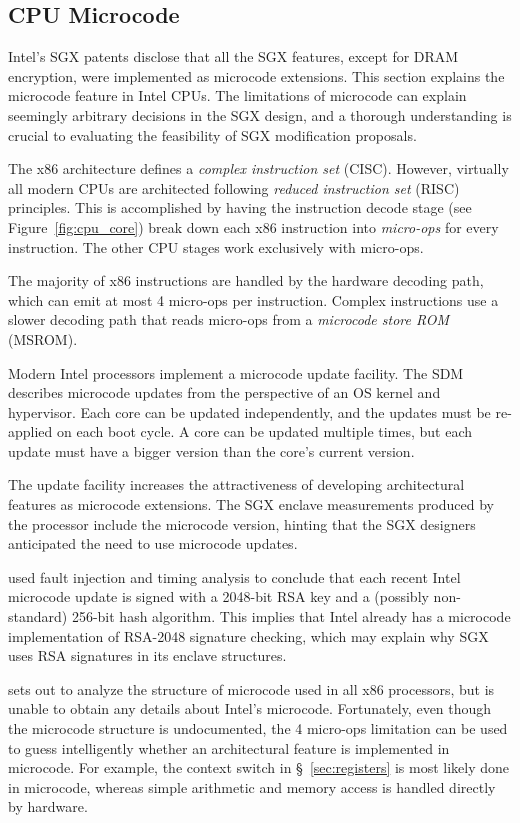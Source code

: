 \subsection{CPU Microcode}
\label{sec:microcode}

Intel's SGX patents disclose that all the SGX features, except for DRAM
encryption, were implemented as microcode extensions. This section explains the
microcode feature in Intel CPUs. The limitations of microcode can explain
seemingly arbitrary decisions in the SGX design, and a thorough understanding
is crucial to evaluating the feasibility of SGX modification proposals.

The x86 architecture defines a \textit{complex instruction set} (CISC).
However, virtually all modern CPUs are architected following \textit{reduced
instruction set} (RISC) principles. This is accomplished by having the
instruction decode stage (see Figure~\ref{fig:cpu_core}) break down each x86
instruction into \textit{micro-ops} for every instruction. The other CPU stages
work exclusively with micro-ops.

The majority of x86 instructions are handled by the hardware decoding path,
which can emit at most 4 micro-ops per instruction. Complex instructions use a
slower decoding path that reads micro-ops from a \textit{microcode store ROM}
(MSROM).

Modern Intel processors implement a microcode update facility. The SDM
describes microcode updates from the perspective of an OS kernel and
hypervisor. Each core can be updated independently, and the updates must be
re-applied on each boot cycle. A core can be updated multiple times, but each
update must have a bigger version than the core's current version.

The update facility increases the attractiveness of developing architectural
features as microcode extensions. The SGX enclave measurements produced by the
processor include the microcode version, hinting that the SGX designers
anticipated the need to use microcode updates.

\cite{hawkes2012microcode} used fault injection and timing analysis to conclude
that each recent Intel microcode update is signed with a 2048-bit RSA key and
a (possibly non-standard) 256-bit hash algorithm. This implies that Intel
already has a microcode implementation of RSA-2048 signature checking, which
may explain why SGX uses RSA signatures in its enclave structures.

\cite{chen2014microcode} sets out to analyze the structure of microcode used in
all x86 processors, but is unable to obtain any details about Intel's
microcode. Fortunately, even though the microcode structure is undocumented,
the 4 micro-ops limitation can be used to guess intelligently whether an
architectural feature is implemented in microcode. For example, the context
switch in \S~\ref{sec:registers} is most likely done in microcode, whereas
simple arithmetic and memory access is handled directly by hardware.
